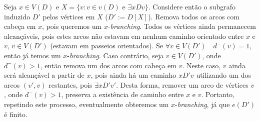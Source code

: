 
Seja $x \in V(D)$ e $X=\{v: v \in v(D)$ e $\exists xDv\}$.
%
Considere então o subgrafo induzido $D'$ pelos vértices em $X$ ($D' := D[X]$).
%
Remova todos os arcos com cabeça em $x$, pois queremos um $x$-{\it branching}.
%
Todos os vértices ainda permanecem alcançáveis, pois estes arcos não estavam em nenhum caminho orientado entre $x$ e $v$, $v \in V(D')$ (estavam em passeios orientados).
%
Se $\forall v \in V(D')\quad d^-(v) = 1$, então já temos um $x$-{\it branching}.
%
Caso contrário, seja $v \in V(D')$, onde $d^-(v) > 1$, então remova um dos arcos com cabeça em $v$.
%
Neste caso, $v$ ainda será alcançável a partir de $x$, pois ainda há um caminho $xD'v$ utilizando um dos arcos $(v',v)$ restantes, pois $\exists xD'v'$.
%
Desta forma, remover um arco de vértices $v$, onde $d^-(v) > 1$, preserva a existência de caminho entre $x$ e $v$.
%
Portanto, repetindo este processo, eventualmente obteremos um $x$-{\it branching}, já que $e(D')$ é finito.
\fimprova
